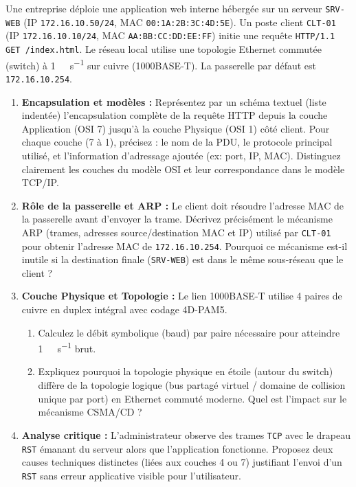 \documentclass[11pt]{article}
\begin{document}
\begin{exercice}
Une entreprise déploie une application web interne hébergée sur un serveur \texttt{SRV-WEB} (IP \texttt{172.16.10.50/24}, MAC \texttt{00:1A:2B:3C:4D:5E}). Un poste client \texttt{CLT-01} (IP \texttt{172.16.10.10/24}, MAC \texttt{AA:BB:CC:DD:EE:FF}) initie une requête \texttt{HTTP/1.1 GET /index.html}. Le réseau local utilise une topologie Ethernet commutée (switch) à \SI{1}{\giga\bit\per\second} sur cuivre (1000BASE-T). La passerelle par défaut est \texttt{172.16.10.254}.
\begin{enumerate}
    \item \textbf{Encapsulation et modèles :} Représentez par un schéma textuel (liste indentée) l'encapsulation complète de la requête HTTP depuis la couche Application (OSI 7) jusqu'à la couche Physique (OSI 1) côté client. Pour chaque couche (7 à 1), précisez : le nom de la PDU, le protocole principal utilisé, et l'information d'adressage ajoutée (ex: port, IP, MAC). Distinguez clairement les couches du modèle OSI et leur correspondance dans le modèle TCP/IP.
    \item \textbf{Rôle de la passerelle et ARP :} Le client doit résoudre l'adresse MAC de la passerelle avant d'envoyer la trame. Décrivez précisément le mécanisme ARP (trames, adresses source/destination MAC et IP) utilisé par \texttt{CLT-01} pour obtenir l'adresse MAC de \texttt{172.16.10.254}. Pourquoi ce mécanisme est-il inutile si la destination finale (\texttt{SRV-WEB}) est dans le même sous-réseau que le client ?
    \item \textbf{Couche Physique et Topologie :} Le lien 1000BASE-T utilise 4 paires de cuivre en duplex intégral avec codage 4D-PAM5.
        \begin{enumerate}
            \item Calculez le débit symbolique (baud) par paire nécessaire pour atteindre \SI{1}{\giga\bit\per\second} brut.
            \item Expliquez pourquoi la topologie physique en étoile (autour du switch) diffère de la topologie logique (bus partagé virtuel / domaine de collision unique par port) en Ethernet commuté moderne. Quel est l'impact sur le mécanisme CSMA/CD ?
        \end{enumerate}
    \item \textbf{Analyse critique :} L'administrateur observe des trames \texttt{TCP} avec le drapeau \texttt{RST} émanant du serveur alors que l'application fonctionne. Proposez deux causes techniques distinctes (liées aux couches 4 ou 7) justifiant l'envoi d'un \texttt{RST} sans erreur applicative visible pour l'utilisateur.
\end{enumerate}
\end{exercice}
\end{document}
